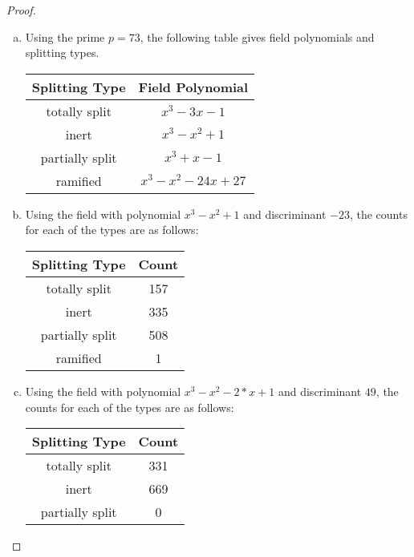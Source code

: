 \documentclass[10pt]{amsart}
\begin{document}
\begin{thm}
  \begin{proof}
    \begin{enumerate}[(a)]
    \item
      Using the prime $p = 73$, the following table gives field polynomials and splitting types.
      \begin{center}
        \begin{tabular}{|c|c|}
          \hline
          Splitting Type & Field Polynomial\\
          \hline
          totally split & $x^3 - 3x - 1$\\ 
          \hline
          inert & $x^3 - x^2 + 1$\\ 
          \hline
          partially split & $x^3 + x - 1$\\
          \hline
          ramified & $x^3 - x^2 - 24x + 27$\\
          \hline
        \end{tabular}
      \end{center}
    \item
      Using the field with polynomial $x^3 - x^2 + 1$ and discriminant $-23$, the counts for each of the types are as follows:
      \begin{center}
        \begin{tabular}{|c|c|}
          \hline
          Splitting Type & Count\\
          \hline
          totally split & 157\\ 
          \hline
          inert & 335\\ 
          \hline
          partially split & 508\\
          \hline
          ramified & 1\\
          \hline
        \end{tabular}
      \end{center}
      \item
        Using the field with polynomial $x^3 - x^2 - 2*x + 1$ and discriminant $49$, the counts for each of the types are as follows:
        \begin{center}
        \begin{tabular}{|c|c|}
          \hline
          Splitting Type & Count\\
          \hline
          totally split & 331\\ 
          \hline
          inert & 669\\ 
          \hline
          partially split & 0 \\

\end{tabular}
\end{center}
\end{enumerate}
\end{proof}
\end{thm}
\end{document}
